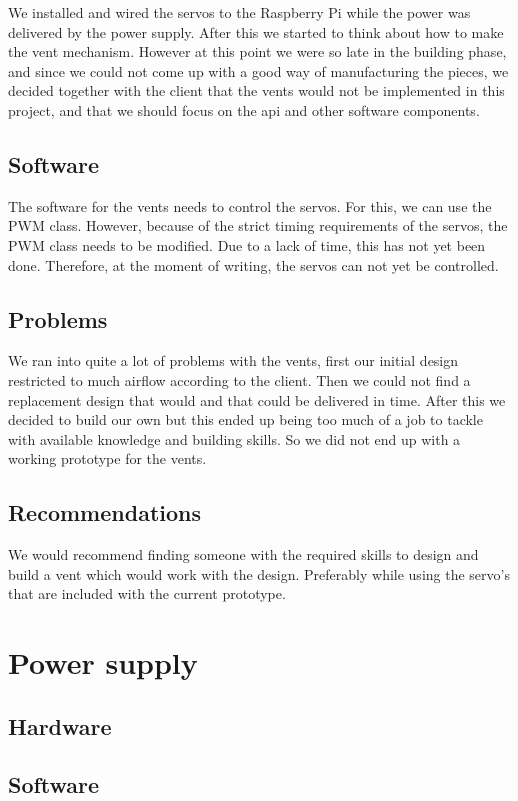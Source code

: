 \documentclass[a4paper,oneside]{book}
\begin{document}
We installed and wired the servos to the Raspberry Pi while the power was
delivered by the power supply. After this we started to think about how to make
the vent mechanism. However at this point we were so late in the building
phase, and since we could not come up with a good way of manufacturing the
pieces, we decided together with the client that the vents would not be
implemented in this project, and that we should focus on the api and other
software components.

\subsection{Software}
The software for the vents needs to control the servos. For this, we can use
the PWM class. However, because of the strict timing requirements of the
servos, the PWM class needs to be modified. Due to a lack of time, this has not
yet been done. Therefore, at the moment of writing, the servos can not yet be
controlled.

\subsection{Problems}
We ran into quite a lot of problems with the vents, first our initial design
restricted to much airflow according to the client. Then we could not find a
replacement design that would and that could be delivered in time. After this
we decided to build our own but this ended up being too much of a job to tackle
with available knowledge and building skills. So we did not end up with a
working prototype for the vents.

\subsection{Recommendations}
We would recommend finding someone with the required skills to design and build
a vent which would work with the design. Preferably while using the servo’s
that are included with the current prototype.

\section{Power supply}
\subsection{Hardware}
\subsection{Software}
\end{document}

